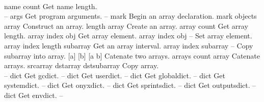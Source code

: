 \begin{longtable}{}
 \\
\hline \hline
\optableent
	{name}
	{{\bf {}}}
	{count}
	{Get name length.}
\hline \hline
{} \\
\hline \hline
\optableent
	{--}
	{{\bf {}}}
	{args}
	{Get program arguments.}
\hline
\optableent
	{--}
	{{\bf \htmlref{[}{systemdict:sym_lb}}}
	{mark}
	{Begin an array declaration.}
\hline
\optableent
	{mark objects}
	{{\bf \htmlref{]}{systemdict:sym_rb}}}
	{array}
	{Construct an array.}
\hline
\optableent
	{length}
	{{\bf {}}}
	{array}
	{Create an array.}
\hline
\optableent
	{array}
	{{\bf {}}}
	{count}
	{Get array length.}
\hline
\optableent
	{array index}
	{{\bf {}}}
	{obj}
	{Get array element.}
\hline
\optableent
	{array index obj}
	{{\bf {}}}
	{--}
	{Set array element.}
\hline
\optableent
	{array index length}
	{{\bf {}}}
	{subarray}
	{Get an array interval.}
\hline
\optableent
	{array index subarray}
	{{\bf {}}}
	{--}
	{Copy subarray into array.}
\hline
\optableent
	{[a] [b]}
	{{\bf {}}}
	{[a b]}
	{Catenate two arrays.}
\hline
\optableent
	{arrays count}
	{{\bf {}}}
	{array}
	{Catenate arrays.}
\hline
\optableent
	{srcarray dstarray}
	{{\bf {}}}
	{dstsubarray}
	{Copy array.}
\hline \hline
{} \\
\hline \hline
\optableent
	{--}
	{{\bf {}}}
	{dict}
	{Get gcdict.}
\hline
\optableent
	{--}
	{{\bf {}}}
	{dict}
	{Get userdict.}
\hline
\optableent
	{--}
	{{\bf {}}}
	{dict}
	{Get globaldict.}
\hline
\optableent
	{--}
	{{\bf {}}}
	{dict}
	{Get systemdict.}
\hline
\optableent
	{--}
	{{\bf {}}}
	{dict}
	{Get onyxdict.}
\hline
\optableent
	{--}
	{{\bf {}}}
	{dict}
	{Get sprintsdict.}
\hline
\optableent
	{--}
	{{\bf {}}}
	{dict}
	{Get outputsdict.}
\hline
\optableent
	{--}
	{{\bf {}}}
	{dict}
	{Get envdict.}
\hline
\optableent
	{--}
	{{\bf {}}}

\end{longtable}
